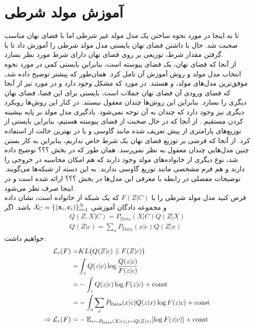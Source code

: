 \section{آموزش مولد شرطی}
تا به اینجا در مورد نحوه ساختن یک مدل مولد غیر شرطی اما با فضای نهان مناسب صحبت شد. حال با داشتن فضای نهان بایستی مدل مولد شرطی را آموزش داد تا با گرفتن مقدار شرط، توزیعی بر روی فضای نهان دارای شرط مورد نظر بسازد.
\\
از آنجا که فضای نهان، یک فضای پیوسته است، بنابراین بایستی کمی در مورد نحوه انتخاب مدل مولد و روش آموزش آن تامل کرد. همان‌طور که پیشتر توضیح داده شد، موفق‌ترین مدل‌های مولد، \gan{} و \vae{} هستند. در مورد \gan{} که مشکل \modecollapse{} وجود دارد و در مورد \vae{} نیز از آنجا که فضای ورودی آن فضای نهان جملات است، بایستی برای این فضا، فضای نهان دیگری را بسازد. بنابراین این روش‌ها چندان معقول نیستند. در کنار این روش‌ها رویکرد دیگری نیز وجود دارد که چندان به آن توجه نمی‌شود. یادگیری مدل مولد بر پایه بیشینه کردن مستقیم \likelihood{}. از آنجا که در حال صحبت از فضای پیوسته هستیم، بنابراین بایستی از توزیع‌های پارامتری از پیش تعریف شده مانند گاوسی و یا در بهترین حالت از
استفاده کرد. از آنجا که فرضی بر توزیع فضای نهان یک شرط خاص نداریم، بنابراین به کار بستن چنین مدل‌هایی چندان معقول به نظر نمی‌رسد. همان طور که در بخش ؟؟؟‌ توضیح داده شد، نوع دیگری از خانواده‌های مولد وجود دارند که هم امکان محاسبه \likelihood{} در خروجی را دارند و هم فرم مشخصی مانند توزیع گاوسی ندارند. به این دسته از شبکه‌ها \normalizingflownets{} می‌گویند. توضیحات مفصلی در رابطه با معرفی این مدل‌ها در بخش ؟؟؟ ارائه شده است و در اینجا صرف نظر می‌شود.
\\
فرض کنید مدل مولد شرطی را با $F(Z|C)$ که یک شبکه از خانواده \normalizingflownets{} است، نشان داده و مجموعه دادگان آموزشی
$\mathcal{X}_C = \{({\bf x}_i, {\bf c}_i)\}_{i=1}^{N}$
باشد. اگر
\begin{gather}
	Q(Z, X|C) = P_\text{Data}(X|C) Q(Z|X)
	\\
	Q(Z|c) = \sum_x P_\text{Data}(x|c) Q(Z|x)
\end{gather}
خواهیم داشت:
\begin{align}
	\mathcal{L}_c (F) = & KL\big(Q(Z|c) ~ || ~ F(Z|c)\big) \nonumber                                          \\
	=                   & \int_z Q(z|c) \log \frac{Q(z|c)}{F(z|c) \nonumber}                                  \\
	=                   & -\int_z Q(z|c) \log F(z|c) + \text{const} \nonumber                                 \\
	=                   & -\int_z \sum_x P_\text{Data}(x|c) Q(z|x) \log F(z|c) + \text{const} \nonumber       \\
	\Rightarrow
	\mathcal{L}_c (F) = & - \mathbb E_{x \sim P_\text{Data}(X|c), z \sim Q(Z|x)} [\log F(z|c)] + \text{const}
\end{align}

